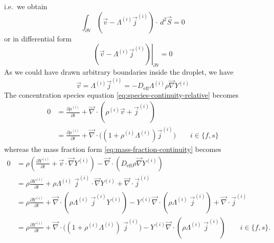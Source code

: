 \documentclass[12pt,twoside]{report}
\begin{document}
i.e.\ we obtain
\begin{equation*}
  \int_{\partial \mathbb{V}}
  (\vec{v} - \Lambda^{(i)} \vec{j}^{(i)})
  \cdot \, d^2\vec{S}
  = 0
\end{equation*}
or in differential form
\begin{equation}
  \left.
  (\vec{v} - \Lambda^{(i)} \vec{j}^{(i)})
  \right|_{\partial \mathbb{V}}
  = 0
\end{equation}
As we could have drawn arbitrary boundaries inside the droplet, we have
\begin{equation}
  \vec{v} =
  \Lambda^{(i)} \vec{j}^{(i)} =
  -D_{\textrm{eff}} \Lambda^{(i)} \rho \vec{\nabla} Y^{(i)}
\end{equation}
The concentration species equation \eqref{eq:species-continuity-relative} becomes
\begin{equation}\label{eq:species-continuity-advection-corrected}
  \begin{aligned}
    0 &=
    \frac{\partial \rho^{(i)}}{\partial t} +
    \vec{\nabla} \cdot
    \left(
    \rho^{(i)} \vec{v} +
    \vec{j}^{(i)}
    \right)
    \\
    &=
    \frac{\partial \rho^{(i)}}{\partial t} +
    \vec{\nabla} \cdot
    \Big(
    (1 + \rho^{(i)} \Lambda^{(i)})
    \vec{j}^{(i)} \Big)
    \qquad i \in \{f,s\}
  \end{aligned}
\end{equation}
whereas the mass fraction form \eqref{eq:mass-fraction-continuity} becomes
\begin{equation}
  \begin{aligned}
    0 &=
    \rho \left(
    \frac{\partial Y^{(i)}}{\partial t} +
    \vec{v} \cdot \vec{\nabla} Y^{(i)}
    \right)
    -
    \vec{\nabla} \cdot (D_{\textrm{eff}} \rho \vec{\nabla} Y^{(i)}) \\
    &=
    \rho
    \frac{\partial Y^{(i)}}{\partial t} +
    \rho \Lambda^{(i)} \; \vec{j}^{(i)} \cdot \vec{\nabla} Y^{(i)}
    +
    \vec{\nabla} \cdot \vec{j}^{(i)} \\
    &=
    \rho
    \frac{\partial Y^{(i)}}{\partial t} +
    \vec{\nabla} \cdot
    (\rho \Lambda^{(i)} \; \vec{j}^{(i)} Y^{(i)}) -
    Y^{(i)} \vec{\nabla} \cdot
    (\rho \Lambda^{(i)} \; \vec{j}^{(i)}) +
    \vec{\nabla} \cdot \vec{j}^{(i)}
    \\
    &=
    \rho
    \frac{\partial Y^{(i)}}{\partial t} +
    \vec{\nabla} \cdot
    \Big(
    (1 + \rho^{(i)} \Lambda^{(i)}) \;
    \vec{j}^{(i)} \Big) -
    Y^{(i)} \vec{\nabla} \cdot
    (\rho \Lambda^{(i)} \; \vec{j}^{(i)})
    \qquad i \in \{f,s\}.
  \end{aligned}
\end{equation}
\end{document}
